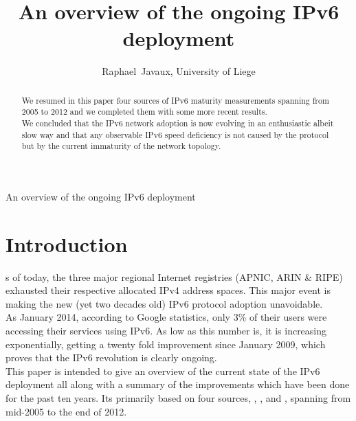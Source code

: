 \documentclass[journal]{IEEEtran}
\begin{document}
\title{An overview of the ongoing IPv6 deployment}

\author{Raphael~Javaux, University of Liege}

         {An overview of the ongoing IPv6 deployment}

\maketitle

\begin{abstract}
    We resumed in this paper four sources of IPv6 maturity measurements spanning
    from 2005 to 2012 and we completed them with some more recent results. \\
    We concluded that the IPv6 network adoption is now evolving in an
    enthusiastic albeit slow way and that any observable IPv6 speed deficiency
    is not caused by the protocol but by the current immaturity of the network
    topology.
\end{abstract}


\section{Introduction}

s of today, the three major regional Internet registries
(APNIC, ARIN \& RIPE) exhausted their respective allocated IPv4 address spaces.
This major event is making the new (yet two decades old) IPv6 protocol adoption
unavoidable. \\
As January 2014, according to Google statistics\cite{google:ipv6}, only 3\%
of their users were accessing their services using IPv6. As low as this number
is, it is increasing exponentially, getting a twenty fold improvement since
January 2009, which proves that the IPv6 revolution is clearly ongoing. \\
This paper is intended to give an overview of the current state of the IPv6
deployment all along with a summary of the improvements which have been done
for the past ten years. Its primarily based on four sources,
\cite{paper1}, \cite{paper2}, \cite{paper3} and \cite{paper4}, spanning from
mid-2005 to the end of 2012. \\
\end{document}
